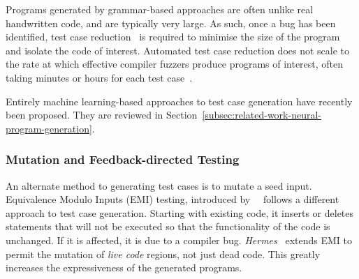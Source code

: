 
Programs generated by grammar-based approaches are often unlike real handwritten code, and are typically very large. As such, once a bug has been identified, test case reduction~\cite{Regehr2012a} is required to minimise the size of the program and isolate the code of interest. Automated test case reduction does not scale to the rate at which effective compiler fuzzers produce programs of interest, often taking minutes or hours for each test case~\cite{Pflanzer2016}.

Entirely machine learning-based approaches to test case generation have recently been proposed. They are reviewed in Section~\ref{subsec:related-work-neural-program-generation}.


\subsubsection{Mutation and Feedback-directed Testing}

An alternate method to generating test cases is to mutate a seed input.
Equivalence Modulo Inputs (EMI) testing, introduced by~\citeauthor{Le2013a}~\cite{Le2013a} follows a different approach to test case generation. Starting with existing code, it inserts or deletes statements that will not be executed so that the functionality of the code is unchanged. If it is affected, it is due to a compiler bug. 
\emph{Hermes}~\cite{Sun2016a} extends EMI to permit the mutation of \emph{live code} regions, not just dead code. This greatly increases the expressiveness of the generated programs.

